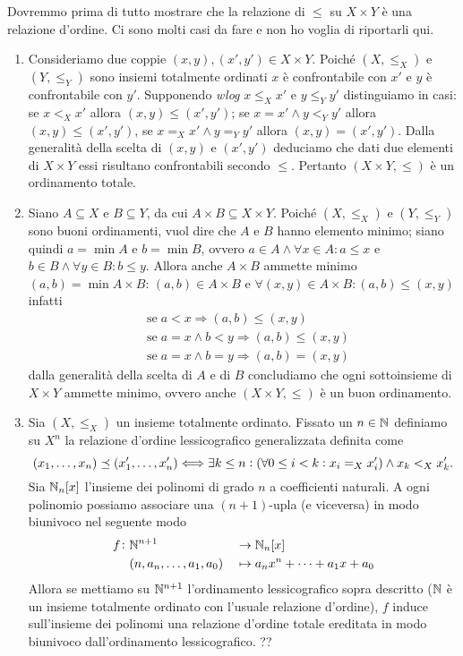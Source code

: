 Dovremmo prima di tutto mostrare che la relazione di $ \leq $ su $ X \times Y $ è una relazione d'ordine. Ci sono molti casi da fare e non ho voglia di riportarli qui.
\begin{enumerate}
\item Consideriamo due coppie $ (x, y), (x', y') \in X \times Y $. Poiché $ (X, \leq_X) $ e $ (Y, \leq_Y) $ sono insiemi totalmente ordinati $ x $ è confrontabile con $ x' $ e $ y $ è confrontabile con $ y' $. Supponendo \emph{wlog} $ x \leq_X x' $ e $ y \leq_Y y' $ distinguiamo in casi: se $ x <_X x' $ allora $ (x, y) \leq (x', y') $; se $ x = x' \wedge y <_Y y' $ allora $ (x, y) \leq (x', y') $, se $ x =_X x' \wedge y =_Y y' $ allora $ (x, y) = (x', y') $. Dalla generalità della scelta di $ (x, y) $ e $ (x', y') $ deduciamo che dati due elementi di $ X \times Y $ essi risultano confrontabili secondo $ \leq $. Pertanto $ (X \times Y, \leq) $ è un ordinamento totale.
\item Siano $ A \subseteq X $ e $ B \subseteq Y $, da cui $ A \times B \subseteq X \times Y $. Poiché $ (X, \leq_X) $ e $ (Y, \leq_Y) $ sono buoni ordinamenti, vuol dire che $ A $ e $ B $ hanno elemento minimo; siano quindi $ a = \min A $ e $ b = \min B $, ovvero $ a \in A \wedge \forall x \in A : a \leq x $ e $ b \in B \wedge \forall y \in B : b \leq y $. Allora anche $ A \times B $ ammette minimo $ (a, b) = \min A \times B $: $ (a, b) \in A \times B $ e $ \forall (x, y) \in A \times B : (a, b) \leq (x, y) $ infatti
  \begin{align*}
    & \text{se} \; a < x \Rightarrow (a, b) \leq (x, y) \\
    & \text{se} \; a = x \wedge b < y \Rightarrow (a, b) \leq (x, y) \\
    & \text{se} \; a= x \wedge b = y \Rightarrow (a, b) = (x, y)
  \end{align*}
  dalla generalità della scelta di $ A $ e di $ B $ concludiamo che ogni sottoinsieme di $ X \times Y $ ammette minimo, ovvero anche $ (X \times Y, \leq) $ è un buon ordinamento.
\item Sia $ (X, \leq_X) $ un insieme totalmente ordinato. Fissato un $ n \in \mathbb{N} $ definiamo su $ X^n $ la relazione d'ordine lessicografico generalizzata definita come
  \[(x_1, \dots, x_n) \preceq (x_1', \dots, x_n') \Longleftrightarrow \exists k \leq n : (\forall 0 \leq i < k : x_i =_X x_i') \wedge x_k <_X x_k'.\]
  Sia $ \mathbb{N}_n[x] $ l'insieme dei polinomi di grado $ n $ a coefficienti naturali. A ogni polinomio possiamo associare una $ (n + 1) $-upla (e viceversa) in modo biunivoco nel seguente modo
  \begin{alignat*}{3}
    f \colon & \mathbb{N}^{n+1} && \to \mathbb{N}_n[x] \\
    & (n, a_n, \dots, a_1, a_0)  && \mapsto a_n x^n + \dots + a_1 x + a_0
  \end{alignat*}
  Allora se mettiamo su $ \mathbb{N}^{n + 1} $ l'ordinamento lessicografico sopra descritto ($ \mathbb{N} $ è un insieme totalmente ordinato con l'usuale relazione d'ordine), $ f $ induce sull'insieme dei polinomi una relazione d'ordine totale ereditata in modo biunivoco dall'ordinamento lessicografico. ?? \\
\end{enumerate}

